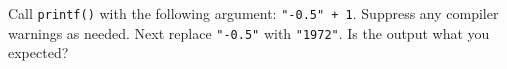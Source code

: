 %
Call \texttt{printf()} with the following argument:
\texttt{"-0.5" + 1}.  Suppress any compiler warnings as needed.
Next replace \texttt{"-0.5"} with \texttt{"1972"}.  Is the
output what you expected?
